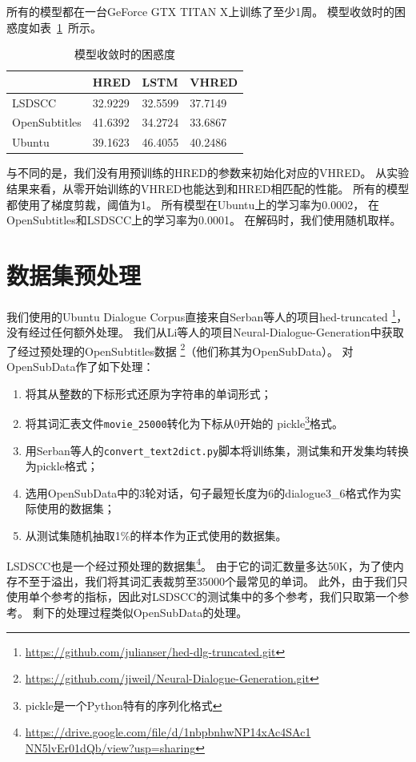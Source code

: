 所有的模型都在一台GeForce GTX TITAN X上训练了至少1周。
模型收敛时的困惑度如表~\ref{tab:converged_perplexity}~所示。
\begin{table}[H]
    \centering
    \caption{模型收敛时的困惑度}
    \label{tab:converged_perplexity}
    \begin{tabular}{llll}
        \toprule
        & HRED & LSTM & VHRED \\
        \midrule
        LSDSCC & 32.9229 & 32.5599 & 37.7149 \\
        OpenSubtitles & 41.6392 & 34.2724 & 33.6867 \\
        Ubuntu & 39.1623 & 46.4055 & 40.2486 \\
        \bottomrule
    \end{tabular}
\end{table}

与\cite{VHRED}不同的是，我们没有用预训练的HRED的参数来初始化对应的VHRED。
从实验结果来看，从零开始训练的VHRED也能达到和HRED相匹配的性能。
所有的模型都使用了梯度剪裁，阈值为1。
所有模型在Ubuntu上的学习率为0.0002，
在OpenSubtitles和LSDSCC上的学习率为0.0001。
在解码时，我们使用随机取样。

\section{数据集预处理}
\label{sec:dataset_proprecessing}
我们使用的Ubuntu Dialogue Corpus直接来自Serban等人的项目hed-truncated
\footnote{\url{https://github.com/julianser/hed-dlg-truncated.git}}，没有经过任何额外处理。
我们从Li等人的项目Neural-Dialogue-Generation中获取了经过预处理的OpenSubtitles数据
\footnote{\url{https://github.com/jiweil/Neural-Dialogue-Generation.git}}（他们称其为OpenSubData）。
对OpenSubData作了如下处理：
\begin{enumerate}
    \item 将其从整数的下标形式还原为字符串的单词形式；
    \item 将其词汇表文件\texttt{movie\_25000}转化为下标从0开始的
    pickle\footnote{pickle是一个Python特有的序列化格式}格式。
    \item 用Serban等人的\texttt{convert\_text2dict.py}脚本将训练集，测试集和开发集均转换为pickle格式；
    \item 选用OpenSubData中的3轮对话，句子最短长度为6的dialogue3\_6格式作为实际使用的数据集；
    \item 从测试集随机抽取1\%的样本作为正式使用的数据集。
\end{enumerate}

LSDSCC也是一个经过预处理的数据集\footnote{\url{https://drive.google.com/file/d/1nbpbnhwNP14xAc4SAc1 NN5lvEr01dQb/view?usp=sharing}}。
由于它的词汇数量多达50K，为了使内存不至于溢出，我们将其词汇表裁剪至35000个最常见的单词。
此外，由于我们只使用单个参考的指标，因此对LSDSCC的测试集中的多个参考，我们只取第一个参考。
剩下的处理过程类似OpenSubData的处理。

